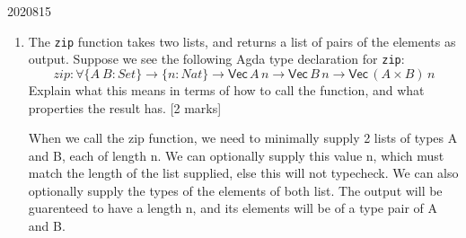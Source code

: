 \documentclass[10pt,\jkfside,a4paper]{article}
\newcommand{\answer}[1]{
    \begin{tcolorbox}[colframe=black, colback=white, sharp corners, boxrule=0.2mm, breakable]
        #1
    \end{tcolorbox}
}
\newcommand{\qmarks}[1]{\hspace*{\fill}[#1]}
\begin{document}
\begin{examquestion}{2020}{8}{15}
\begin{enumerate}
\begin{enumerate}
            \end{enumerate}

        \item
            The \texttt{zip} function takes two lists, and returns a list of pairs of the
            elements as output. Suppose we see the following Agda type declaration for
            \texttt{zip}:
            \[
                \mathit{zip} : \forall \{A\ B : \mathit{Set}\} \to \{n : \mathit{Nat}\} \to \mathsf{Vec}\,A\,n \to \mathsf{Vec}\,B\,n \to \mathsf{Vec}\,(A \times B)\,n
            \]
            Explain what this means in terms of how to call the function, and what
            properties the result has. \qmarks{2 marks}

            \answer{ 
                When we call the zip function, we need to minimally supply 2 lists of types A and B, each of length n. We can optionally supply this value n, which must match the length of the list supplied, else this will not typecheck. We can also optionally supply the types of the elements of both list. The output will be guarenteed to have a length n, and its elements will be of a type pair of A and B. 
            }

    \end{enumerate}

\end{examquestion}
\end{document}
